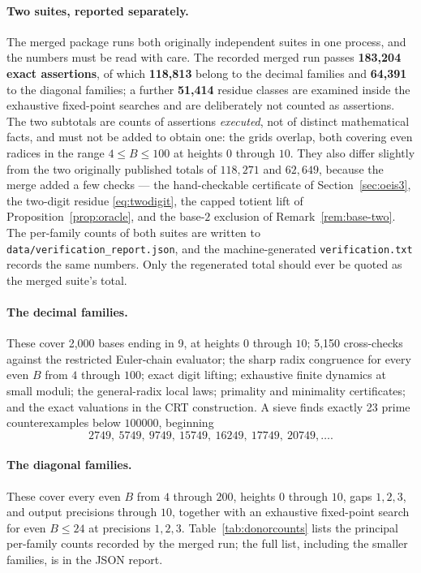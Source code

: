 \documentclass[11pt,letterpaper]{article}
\numberwithin{equation}{section}
\theoremstyle{definition}
\theoremstyle{remark}
\begin{document}
\paragraph{Two suites, reported separately.}
The merged package runs both originally independent suites in one process, and the numbers must be read with care. The recorded merged run passes \textbf{183,204 exact assertions}, of which \textbf{118,813} belong to the decimal families and \textbf{64,391} to the diagonal families; a further \textbf{51,414} residue classes are examined inside the exhaustive fixed-point searches and are deliberately not counted as assertions. The two subtotals are counts of assertions \emph{executed}, not of distinct mathematical facts, and must not be added to obtain one: the grids overlap, both covering even radices in the range $4\le B\le100$ at heights $0$ through $10$. They also differ slightly from the two originally published totals of $118{,}271$ and $62{,}649$, because the merge added a few checks --- the hand-checkable certificate of Section~\ref{sec:oeis3}, the two-digit residue \eqref{eq:twodigit}, the capped totient lift of Proposition~\ref{prop:oracle}, and the base-$2$ exclusion of Remark~\ref{rem:base-two}. The per-family counts of both suites are written to \texttt{data/verification\_report.json}, and the machine-generated \texttt{verification.txt} records the same numbers. Only the regenerated total should ever be quoted as the merged suite's total.

\paragraph{The decimal families.}
These cover 2,000 bases ending in 9, at heights $0$ through $10$; 5,150 cross-checks against the restricted Euler-chain evaluator; the sharp radix congruence for every even $B$ from $4$ through $100$; exact digit lifting; exhaustive finite dynamics at small moduli; the general-radix local laws; primality and minimality certificates; and the exact valuations in the CRT construction. A sieve finds exactly 23 prime counterexamples below $100000$, beginning
\[
 2749,\ 5749,\ 9749,\ 15749,\ 16249,\ 17749,\ 20749,\ldots.
\]

\paragraph{The diagonal families.}
These cover every even $B$ from $4$ through $200$, heights $0$ through $10$, gaps $1,2,3$, and output precisions through $10$, together with an exhaustive fixed-point search for even $B\le24$ at precisions $1,2,3$. Table~\ref{tab:donorcounts} lists the principal per-family counts recorded by the merged run; the full list, including the smaller families, is in the JSON report.
\end{document}
